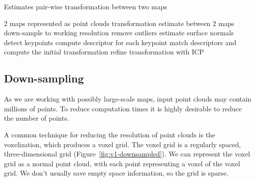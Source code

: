 \begin{algorithm}
    \caption[Pair-wise transformation estimation]{Estimates pair-wise transformation between two maps}
    \label{alg:estimate-pair}
    \begin{algorithmic}[1]
        \Require $2$ maps represented as point clouds
        \Ensure transformation estimate between $2$ maps
            \State down-sample to working resolution
            \State remove outliers
            \State estimate surface normals
            \State detect keypoints
            \State compute descriptor for each keypoint
            \State match descriptors and compute the initial transformation
            \State refine transformation with \gls{ICP}
        \EndProcedure
    \end{algorithmic}
\end{algorithm}

\subsection{Down-sampling}
\label{sec:downsampling}

As we are working with possibly large-scale maps, input point clouds may contain millions of points. To reduce computation times it is highly desirable to reduce the number of points.

A common technique for reducing the resolution of point clouds is the voxelization, which produces a voxel grid. The voxel grid is a regularly spaced, three-dimensional grid (Figure~\ref{fig:v1-downsampled}). We can represent the voxel grid as a normal point cloud, with each point representing a voxel of the voxel grid. We don't usually save empty space information, so the grid is sparse.

